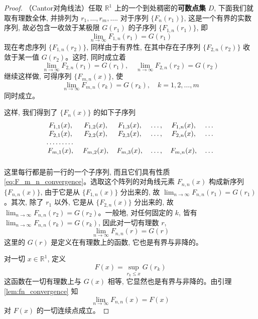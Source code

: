 \begin{proof}
    （Cantor对角线法）任取 $\mathbb{R}^1$ 上的一个到处稠密的\textbf{可数点集} $D$, 下面我们就取有理数全体, 并排列为 $r_1, \ldots, r_m, \ldots$. 对于序列 $\{F_{n}(r_1)\}$, 这是一个有界的实数序列, 故必包含一收敛于某极限 $G(r_1)$ 的子序列 $\{F_{1,n}(r_1)\}$, 即
\[
\lim_{n\to\infty} F_{1,n}(r_1) = G(r_1)
\]
现在考虑序列 $\{F_{1,n}(r_2)\}$, 同样由于有界性, 在其中存在子序列 $\{F_{2,n}(r_2)\}$ 收敛于某一值 $G(r_2)$。这时, 同时成立着
\[
\lim_{n\to\infty} F_{2,n}(r_1)=G(r_1), \quad \lim_{n\to\infty} F_{2,n}(r_2)=G(r_2)
\]
继续这样做, 可得序列 $\{F_{m,n}(x)\}$, 使
\begin{equation} \label{eq:F_m_n_convergence}
\lim_{n\to\infty} F_{m,n}(r_k) = G(r_k), \quad k=1,2,\ldots,m
\end{equation}
同时成立。

这样, 我们得到了 $\{F_n(x)\}$ 的如下子序列
\begin{equation} \label{eq:subsequence_array}
\begin{blockarray}{ccccccc}
F_{1,1}(x), & F_{1,2}(x), & F_{1,3}(x), & \ldots, & F_{1,n}(x), & \ldots \\
F_{2,1}(x), & F_{2,2}(x), & F_{2,3}(x), & \ldots, & F_{2,n}(x), & \ldots \\
\ldots\ldots\ldots \\
F_{m,1}(x), & F_{m,2}(x), & F_{m,3}(x), & \ldots, & F_{m,n}(x), & \ldots \\
\end{blockarray}
\end{equation}
这里每行都是前一行的一个子序列, 而且它们具有性质 \eqref{eq:F_m_n_convergence}。选取这个阵列的对角线元素 $F_{n,n}(x)$ 构成新序列 $\{F_{n,n}(x)\}$, 由于它是从 $\{F_{1,n}(x)\}$ 分出来的, 故 $\lim_{n\to\infty} F_{n,n}(r_1) = G(r_1)$。其次, 除了 $r_1$ 以外, 它是从 $\{F_{2,n}(x)\}$ 分出来的, 故 $\lim_{n\to\infty} F_{n,n}(r_2) = G(r_2)$。一般地, 对任何固定的 $k$, 皆有 $\lim_{n\to\infty} F_{n,n}(r_k) = G(r_k)$, 因此对一切有理数 $r$,
\begin{equation} \label{eq:diagonal_convergence}
\lim_{n\to\infty} F_{n,n}(r) = G(r)
\end{equation}
这里的 $G(r)$ 是定义在有理数上的函数, 它也是有界与非降的。

对一切 $x\in\mathbb{R}^1$, 定义
\[
F(x) = \sup_{r_k \le x} G(r_k)
\]
这函数在一切有理数上与 $G(x)$ 相等, 它显然也是有界与非降的。由引理 \eqref{lem:fn_convergence} 知
\begin{equation} \label{eq:final_convergence}
\lim_{n\to\infty} F_{n,n}(x) = F(x)
\end{equation}
对 $F(x)$ 的一切连续点成立。

\end{proof}
